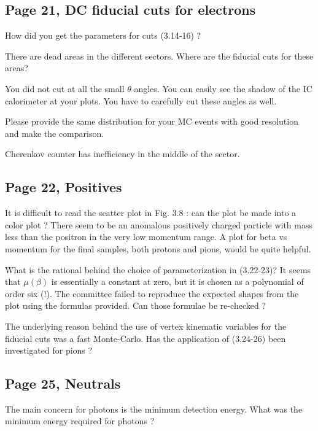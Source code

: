 \documentclass[11pt]{paper}
\begin{document}

\subsection*{Page 21, DC fiducial cuts for electrons}
How did you get the parameters for cuts (3.14-16) ?

There are dead areas in the different sectors. Where are the fiducial cuts for these areas?

You did not cut at all the small $\theta$ angles. You can easily see the shadow of the IC calorimeter
at your plots. You have to carefully cut these angles as well.

Please provide the same distribution for your MC events with good resolution and make the comparison.

Cherenkov counter has inefficiency in the middle of the sector.  

\subsection*{Page 22, Positives}


It is difficult to read the scatter plot in Fig. 3.8 : can the plot be made into a color plot ?
There seem to be an anomalous positively charged particle with mass less than the positron in the very low momentum range.
A plot for beta vs momentum for the final samples, both protons and pions, would be quite helpful.

What is the rational behind the choice of parameterization in (3.22-23)?
It seems that $\mu(\beta)$ is essentially a constant at zero, but it is chosen as a polynomial of order six (!).
The committee failed to reproduce the expected shapes from the plot using the formulas provided.
Can those formulae be re-checked ?

The underlying reason behind the use of vertex kinematic variables for the fiducial cuts was a fast Monte-Carlo.
Has the application of (3.24-26) been investigated for pions ?

\subsection*{Page 25, Neutrals}

The main concern for photons is the minimum detection energy.
What was the minimum energy required for photons ?
\end{document}
